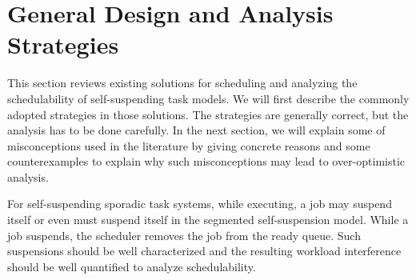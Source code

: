 \section{General Design and Analysis Strategies}
\label{sec:review}

This section reviews existing solutions for scheduling and analyzing the schedulability of self-suspending task models. We will first describe the commonly adopted strategies in those solutions. The  strategies are generally correct, but the analysis has to be done carefully.  In the next section, we will explain some of misconceptions used in the literature by giving concrete reasons and some counterexamples to explain why such misconceptions may lead to over-optimistic analysis. 

For self-suspending sporadic task systems, while executing, a job may suspend itself or even must suspend itself in the segmented self-suspension model. While a job suspends, the scheduler removes the job from the ready queue. Such suspensions should be well characterized and the resulting workload interference should be well quantified to analyze schedulability.

